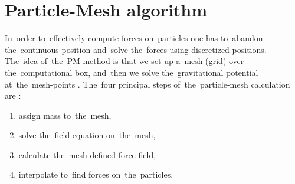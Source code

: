 \section{Particle-Mesh algorithm}
\label{sec:PM}
In~order to~effectively compute forces on~particles one has to~abandon the~continuous position and~solve the~forces using discretized positions. The~idea of~the~PM method is that we set up a~mesh (grid) over the~computational box, and~then we solve the~gravitational potential at~the~mesh-points \parencite{n_body_Lindholm}. The~four principal steps of~the~particle-mesh calculation are \parencite{Hockney:1988:CSU:62815}:
\begin{enumerate}
    \item assign mass to~the~mesh,
    \label{it:pm_1}
    \item solve the~field equation on~the~mesh,
    \label{it:pm_2}
    \item calculate the~mesh-defined force field,
    \label{it:pm_3}
    \item interpolate to~find forces on~the~particles.
    \label{it:pm_4}
\end{enumerate}

